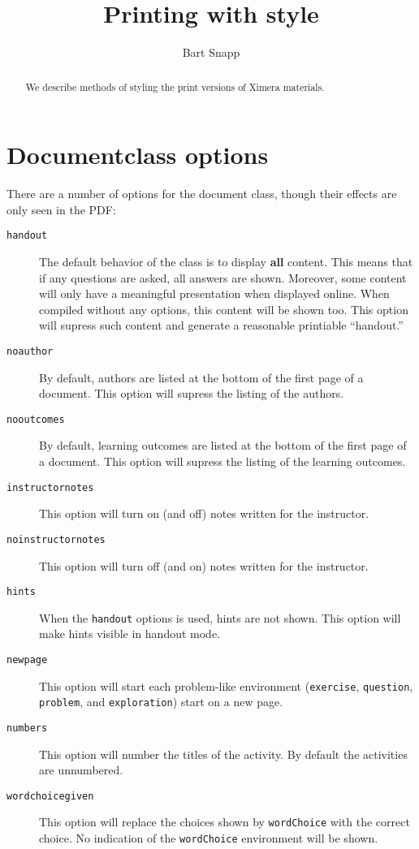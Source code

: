 \documentclass{ximera}
\title{Printing with style}
\author{Bart Snapp}
\begin{document}
\begin{abstract}
We describe methods of styling the print versions of Ximera materials.
\end{abstract}
\maketitle
 


\section{Documentclass options}

There are a number of options for the document class, though their
effects are only seen in the PDF:
 
\begin{description}
\item[\texttt{handout}] The default behavior of the class is to display \textbf{all} content. This means that if any questions are asked, all answers are shown. Moreover, some content will only have a meaningful presentation when displayed online. When compiled without any options, this content will be shown too. This option will supress such content and generate a reasonable printiable ``handout.''
\item[\texttt{noauthor}] By default, authors are listed at the bottom of the first page of a document. This option will supress the listing of the authors.
\item[\texttt{nooutcomes}] By default, learning outcomes are listed at the bottom of the first page of a document. This option will supress the listing of the learning outcomes.
\item[\texttt{instructornotes}] This option will turn on (and off) notes written for the instructor.
\item[\texttt{noinstructornotes}] This option will turn off (and on) notes written for the instructor.
\item[\texttt{hints}] When the \texttt{handout} options is used, hints are not shown. This option will make hints visible in handout mode.
\item[\texttt{newpage}] This option will start each problem-like environment (\texttt{exercise}, \texttt{question}, \texttt{problem}, and \texttt{exploration}) start on a new page.
\item[\texttt{numbers}] This option will number the titles of the activity. By default the activities are unnumbered.
\item[\texttt{wordchoicegiven}] This option will replace the choices shown by \texttt{wordChoice} with the correct choice. No indication of the \texttt{wordChoice} environment will be shown.
\end{description}
\end{document}
